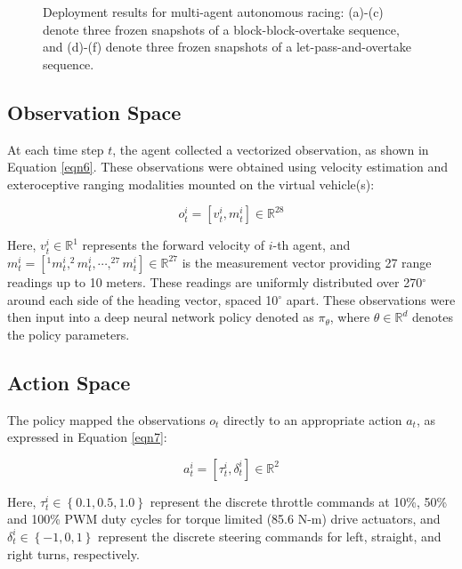 \documentclass[letterpaper, 10 pt, conference]{ieeeconf}  %
\begin{document}
\begin{figure}[t]
\begin{subfigure}[b]{0.16\linewidth}
         \caption{}
         \label{fig10f}
     \end{subfigure}
     \caption{Deployment results for multi-agent autonomous racing: (a)-(c) denote three frozen snapshots of a block-block-overtake sequence, and (d)-(f) denote three frozen snapshots of a let-pass-and-overtake sequence.}
    \label{fig10}
\end{figure}

\subsection{Observation Space}
\label{Sub-Section: Observation Space II}

At each time step $t$, the agent collected a vectorized observation, as shown in Equation \ref{eqn6}. These observations were obtained using velocity estimation and exteroceptive ranging modalities mounted on the virtual vehicle(s):

\begin{equation}
o_t^i = \left [ v_t^i, m_t^i \right ] \in \mathbb{R}^{28}
\label{eqn6}
\end{equation}

Here, $v_t^i \in \mathbb{R}^{1}$ represents the forward velocity of $i$-th agent, and $m_t^i = \left [ ^{1}m_t^i, ^{2}m_t^i, \cdots, ^{27}m_t^i \right ] \in \mathbb{R}^{27}$ is the measurement vector providing 27 range readings up to 10 meters. These readings are uniformly distributed over 270$^{\circ}$ around each side of the heading vector, spaced 10$^{\circ}$ apart. These observations were then input into a deep neural network policy denoted as $\pi_{\theta}$, where $\theta \in \mathbb{R}^d$ denotes the policy parameters.

\subsection{Action Space}
\label{Sub-Section: Action Space II}

The policy mapped the observations $o_t$ directly to an appropriate action $a_t$, as expressed in Equation \ref{eqn7}:

\begin{equation}
a_t^i = \left [ \tau_t^i, \delta_t^i \right ] \in \mathbb{R}^{2}
\label{eqn7}
\end{equation}

Here, $\tau_t^i \in \left \{ 0.1, 0.5, 1.0 \right \}$ represent the discrete throttle commands at 10\%, 50\% and 100\% PWM duty cycles for torque limited (85.6 N-m) drive actuators, and $\delta_t^i \in \left \{ -1, 0, 1 \right \}$ represent the discrete steering commands for left, straight, and right turns, respectively.
\end{document}
